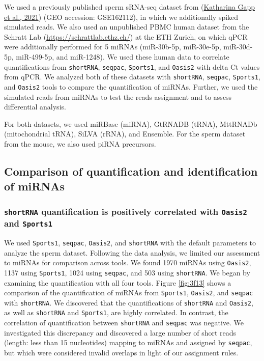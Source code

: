\documentclass[12pt,twoside]{reedthesis}
\begin{document}
We used a previously published sperm sRNA-seq dataset from (\protect\hyperlink{ref-gapp2021}{Katharina Gapp et al., 2021})
(GEO accession: GSE162112), in which we additionally spiked simulated
reads. We also used an unpublished PBMC human dataset from the Schratt
Lab (\url{https://schrattlab.ethz.ch/}) at the ETH Zurich, on which qPCR
were additionally performed for 5 miRNAs (miR-30b-5p, miR-30e-5p,
miR-30d-5p, miR-499-5p, and miR-1248). We used these human data to
correlate quantifications from \texttt{shortRNA}, \texttt{seqpac}, \texttt{Sports1}, and \texttt{Oasis2}
with delta Ct values from qPCR. We analyzed both of these datasets with
\texttt{shortRNA}, \texttt{seqpac}, \texttt{Sports1}, and \texttt{Oasis2} tools to compare the
quantification of miRNAs. Further, we used the simulated reads from
miRNAs to test the reads assignment and to assess differential analysis.

For both datasets, we used miRBase (miRNA), GtRNADB (tRNA), MttRNADb
(mitochondrial tRNA), SiLVA (rRNA), and Ensemble. For the sperm dataset
from the mouse, we also used piRNA precursors.

\hypertarget{comparison-of-quantification-and-identification-of-mirnas}{%
\subsection{Comparison of quantification and identification of miRNAs}\label{comparison-of-quantification-and-identification-of-mirnas}}

\hypertarget{shortrna-quantification-is-positively-correlated-with-oasis2-and-sports1}{%
\subsubsection{\texorpdfstring{\texttt{shortRNA} quantification is positively correlated with \texttt{Oasis2} and \texttt{Sports1}}{shortRNA quantification is positively correlated with Oasis2 and Sports1}}\label{shortrna-quantification-is-positively-correlated-with-oasis2-and-sports1}}

We used \texttt{Sports1}, \texttt{seqpac}, \texttt{Oasis2}, and \texttt{shortRNA} with the default
parameters to analyze the sperm dataset. Following the data analysis, we
limited our assessment to miRNAs for comparison across tools. We found
1970 miRNAs using \texttt{Oasis2}, 1137 using \texttt{Sports1}, 1024 using \texttt{seqpac}, and 503
using \texttt{shortRNA}. We began by examining the quantification with all four
tools. Figure \ref{fig:3f13} shows a comparison of the quantification of miRNAs from
\texttt{Sports1}, \texttt{Oasis2}, and \texttt{seqpac} with \texttt{shortRNA}. We discovered that the
quantifications of \texttt{shortRNA} and \texttt{Oasis2}, as well as \texttt{shortRNA} and \texttt{Sports1},
are highly correlated. In contrast, the correlation of quantification
between \texttt{shortRNA} and \texttt{seqpac} was negative. We investigated this
discrepancy and discovered a large number of short reads (length: less
than 15 nucleotides) mapping to miRNAs and assigned by \texttt{seqpac}, but which
were considered invalid overlaps in light of our assignment rules.
\end{document}
